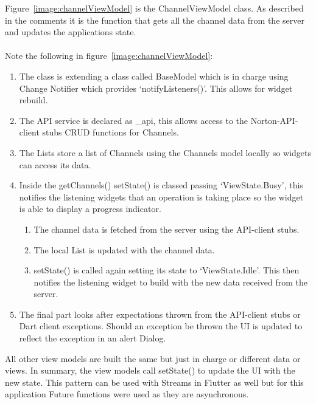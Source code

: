 Figure~\ref{image:channelViewModel} is the ChannelViewModel class. As described in the comments it is the function that gets all the channel data from the server and updates the applications state.
\\\\ Note the following in figure~\ref{image:channelViewModel}: 
\begin{enumerate}
    \item The class is extending a class called BaseModel which is in charge using Change Notifier which provides ‘notifyListeners()’. This allows for widget rebuild.
    \item The API service is declared as \_api, this allows access to the Norton-API-client stubs CRUD functions for Channels.
    \item The Lists store a list of Channels using the Channels model locally so widgets can access its data.
    \item Inside the getChannels() setState() is classed passing ‘ViewState.Busy’, this notifies the listening widgets that an operation is taking place so the widget is able to display a progress indicator. 
    \begin{enumerate}
        \item The channel data is fetched from the server using the API-client stubs.
        \item The local List is updated with the channel data.
        \item setState() is called again setting its state to ‘ViewState.Idle’. This then notifies the listening widget to build with the new data received from the server.
    \end{enumerate}
    \item The final part looks after expectations thrown from the API-client stubs or Dart client exceptions. Should an exception be thrown the UI is updated to reflect the exception in an alert Dialog. 
\end{enumerate}
All other view models are built the same but just in charge or different data or views. In summary, the view models call setState() to update the UI with the new state. This pattern can be used with Streams in Flutter as well but for this application Future functions were used as they are asynchronous.

